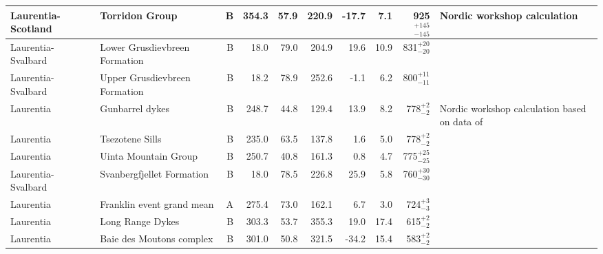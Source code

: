 \begin{longtable}{p{1 in}p{1 in}rrrrrrrp{1.5 in}}
            Laurentia-Scotland &                                   Torridon Group &      B &     354.3 &      57.9 & 220.9 & -17.7 &       7.1 &  925$^{+145}_{-145}$ &                        Nordic workshop calculation \\ \hline
            Laurentia-Svalbard &                    Lower Grusdievbreen Formation &      B &      18.0 &      79.0 & 204.9 &  19.6 &      10.9 &    831$^{+20}_{-20}$ &                                 \cite{Maloof2006a} \\ \hline
            Laurentia-Svalbard &                    Upper Grusdievbreen Formation &      B &      18.2 &      78.9 & 252.6 &  -1.1 &       6.2 &    800$^{+11}_{-11}$ &                                 \cite{Maloof2006a} \\ \hline
                     Laurentia &                                  Gunbarrel dykes &      B &     248.7 &      44.8 & 129.4 &  13.9 &       8.2 &      778$^{+2}_{-2}$ &  Nordic workshop calculation based on data of \cite{Harlan1993a, Harlan1997a} \\ \hline
                     Laurentia &                                  Tsezotene Sills &      B &     235.0 &      63.5 & 137.8 &   1.6 &       5.0 &      778$^{+2}_{-2}$ &                                   \cite{Park1989a} \\ \hline
                     Laurentia &                             Uinta Mountain Group &      B &     250.7 &      40.8 & 161.3 &   0.8 &       4.7 &    775$^{+25}_{-25}$ &                                   \cite{Weil2006b} \\ \hline
            Laurentia-Svalbard &                        Svanbergfjellet Formation &      B &      18.0 &      78.5 & 226.8 &  25.9 &       5.8 &    760$^{+30}_{-30}$ &                                 \cite{Maloof2006a} \\ \hline
                     Laurentia &                        Franklin event grand mean &      A &     275.4 &      73.0 & 162.1 &   6.7 &       3.0 &      724$^{+3}_{-3}$ &                               \cite{Denyszyn2009a} \\ \hline
                     Laurentia &                                 Long Range Dykes &      B &     303.3 &      53.7 & 355.3 &  19.0 &      17.4 &      615$^{+2}_{-2}$ &                                 \cite{Murthy1992a} \\ \hline
                     Laurentia &                         Baie des Moutons complex &      B &     301.0 &      50.8 & 321.5 & -34.2 &      15.4 &      583$^{+2}_{-2}$ &                             \cite{McCausland2011a} \\ \hline

\end{longtable}
